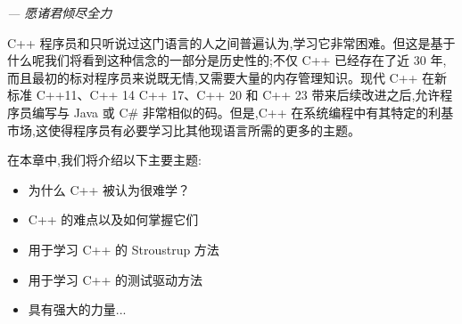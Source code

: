 \begin{flushright}
\textit{--- 愿诸君倾尽全力}
\end{flushright}

C++ 程序员和只听说过这门语言的人之间普遍认为,学习它非常困难。但这是基于什么呢我们将看到这种信念的一部分是历史性的;不仅 C++ 已经存在了近 30 年,而且最初的标对程序员来说既无情,又需要大量的内存管理知识。现代 C++ 在新标准 C++11、C++ 14 C++ 17、C++ 20 和 C++ 23 带来后续改进之后,允许程序员编写与 Java 或 C\# 非常相似的码。但是,C++ 在系统编程中有其特定的利基市场,这使得程序员有必要学习比其他现语言所需的更多的主题。

在本章中,我们将介绍以下主要主题:

\begin{itemize}
\item 
为什么 C++ 被认为很难学？

\item 
C++ 的难点以及如何掌握它们

\item 
用于学习 C++ 的 Stroustrup 方法

\item 
用于学习 C++ 的测试驱动方法

\item 
具有强大的力量...
\end{itemize}



